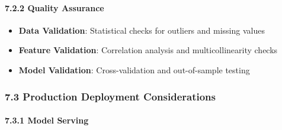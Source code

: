\paragraph{7.2.2 Quality Assurance}\label{quality-assurance}

\begin{itemize}
\tightlist
\item
  \textbf{Data Validation}: Statistical checks for outliers and missing
  values
\item
  \textbf{Feature Validation}: Correlation analysis and
  multicollinearity checks
\item
  \textbf{Model Validation}: Cross-validation and out-of-sample testing
\end{itemize}

\subsubsection{7.3 Production Deployment
Considerations}\label{production-deployment-considerations}

\paragraph{7.3.1 Model Serving}\label{model-serving}

